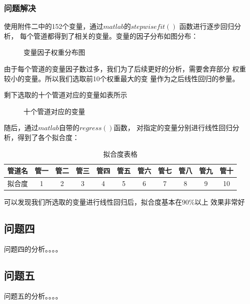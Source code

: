         \subsubsection{问题解决}
            使用附件二中的152个变量，通过$matlab$的$stepwisefit()$
            函数进行逐步回归分析，
            每个管道都得到了相关的变量。变量的因子分布如图分布：
            \begin{figure}[H]
                \caption{变量因子权重分布图}
            \end{figure}
            由于每个管道的变量因子数过多，我们为了后续更好的分析，需要舍弃部分
            权重较小的变量。所以我们选取前10个权重最大的变
            量作为之后线性回归的参量。\par
            剩下选取的十个管道对应的变量如表所示
            \begin{figure}[H]
                \caption{十个管道对应的变量}
            \end{figure}
            随后，通过$matlab$自带的$regress()$函数，
            对指定的变量分别进行线性回归分析，得到了各个拟合度：
            \begin{table}[H]
                \centering
                \begin{tabular}{|c|c|c|c|c|c|c|c|c|c|c|}
                    \hline
                    管道名&管一&管二&管三&管四&管五&管六&管七&管八&管九&管十\\
                    \hline
                    拟合度&1&2&3&4&5&6&7&8&9&10\\
                    \hline
                \end{tabular}
                \caption{拟合度表格}
            \end{table}
            可以发现我们所选取的变量进行线性回归后，拟合度基本在$90\%$以上
            效果非常好
    \subsection{问题四}
        问题四的分析。。。。
    \subsection{问题五}
        问题五的分析。。。。    